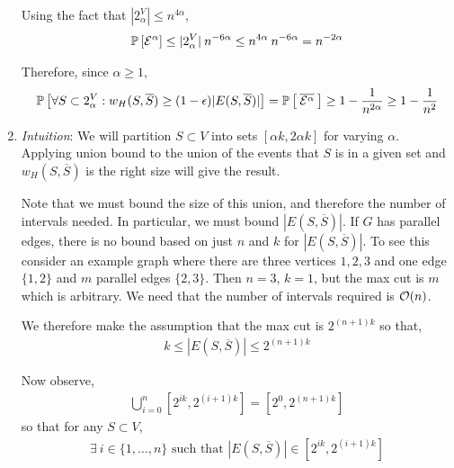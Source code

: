 \documentclass[10pt]{article}
\begin{document}
\begin{solution}[Solution]
\begin{enumerate}[label=(\alph*)]
        Using the fact that \( |2^V_{\alpha}| \leq n^{4 \alpha} \),
        \begin{align*}
            \mathbb{P} \left[ \mathcal{E}^{\alpha} \right]
            \leq|2^V_{\alpha}| \: n^{-6 \alpha}
            \leq n^{4 \alpha} \: n^{-6 \alpha}
            = n^{-2 \alpha}
        \end{align*}
        
        Therefore, since \( \alpha \geq 1 \),
        \begin{align*}
            \mathbb{P} \left[ \forall S\subset 2^V_{\alpha} : w_H(S,\overline{S}) \geq (1-\epsilon) |E(S,\overline{S})| \right] 
            = \mathbb{P}\left[ \: \overline{\mathcal{E}^{\alpha}} \: \right]
            \geq 1 - \frac{1}{n^{2 \alpha}}
            \geq 1 - \frac{1}{n^2}
        \end{align*}

       

    \item

        \textit{Intuition}: We will partition \( S\subset V \) into sets \( [\alpha k,2 \alpha k] \) for varying \( \alpha \). Applying union bound to the union of the events that \( S \) is in a given set and \( w_H(S,\overline{S}) \) is the right size will give the result.

        Note that we must bound the size of this union, and therefore the number of intervals needed. In particular, we must bound \( |E(S,\overline{S})| \). If \( G \) has parallel edges, there is no bound based on just \( n \) and \( k \) for \( |E(S,\overline{S})| \). To see this consider an example graph where there are three vertices \( 1,2,3 \) and one edge \( \{1,2\} \) and \( m \) parallel edges \( \{2,3\} \). Then \( n=3 \), \( k=1 \), but the max cut is \( m \) which is arbitrary.
We need that the number of intervals required is \( \mathcal{O}(n) \). 

        
        We therefore make the assumption that the max cut is \(  2^{(n+1)k} \) so that,
        \begin{align*}
            k \leq |E(S,\overline{S})| \leq 2^{(n+1)k}
        \end{align*}
 
        Now observe,
        \begin{align*}
            \bigcup_{i=0}^{n} \left[ 2^{ik},2^{(i+1)k} \right]
            = [2^0, 2^{(n+1) k}] 
        \end{align*}
        so that for any \( S\subset V \),
        \begin{align*}
            \exists \: i \in \{1,\ldots, n \} \text{ such that } |E(S,\overline{S})| \in[ 2^{i k}, 2^{(i+1) k}]
        \end{align*}


\end{enumerate}
\end{solution}
\end{document}
